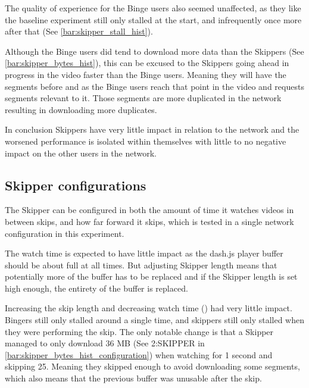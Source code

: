 \if{}

\fi

The quality of experience for the Binge users also seemed unaffected, as they like the baseline experiment still only stalled at the start, and infrequently once more after that (See \autoref{bar:skipper_stall_hist}). 

\if{}

\fi


Although the Binge users did tend to download more data than the Skippers (See \autoref{bar:skipper_bytes_hist}), this can be excused to the Skippers going ahead in progress in the video faster than the Binge users. Meaning they will have the segments before and as the Binge users reach that point in the video and requests segments relevant to it. Those segments are more duplicated in the network resulting in downloading more duplicates.

\if{}

\fi


In conclusion Skippers have very little impact in relation to the network and the worsened performance is isolated within themselves with little to no negative impact on the other users in the network.

\subsection{Skipper configurations}
The Skipper can be configured in both the amount of time it watches videos in between skips, and how far forward it skips, which is tested in a single network configuration in this experiment.

The watch time is expected to have little impact as the dash.js player buffer should be about full at all times. But adjusting Skipper length means that potentially more of the buffer has to be replaced and if the Skipper length is set high enough, the entirety of the buffer is replaced. %

Increasing the skip length and decreasing watch time () had very little impact. Bingers still only stalled around a single time, and skippers still only stalled when they were performing the skip. The only notable change is that a Skipper managed to only download 36 \ac{MB} (See 2:SKIPPER in \autoref{bar:skipper_bytes_hist_configuration}) when watching for 1 second and skipping 25. Meaning they skipped enough to avoid downloading some segments, which also means that the previous buffer was unusable after the skip. 

